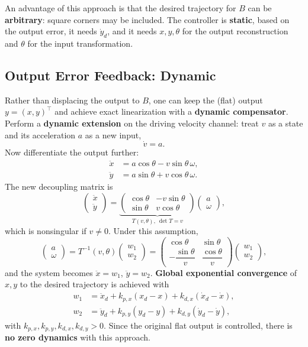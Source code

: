 An advantage of this approach is that the desired trajectory for
\( B \) can be \textbf{arbitrary}: square corners may be included. The
controller is \textbf{static}, based on the output error, it needs
\( \dot{y}_d \), and it needs \( x, y, \theta \) for the output
reconstruction and \( \theta \) for the input transformation.

\subsection{Output Error Feedback: Dynamic}
\label{subsec:output-error-dynamic}

Rather than displacing the output to \( B \), one can keep the (flat)
output \( y = (x, y)^\top \) and achieve exact linearization with a
\textbf{dynamic compensator}. Perform a \textbf{dynamic extension} on
the driving velocity channel: treat \( v \) as a state and its
acceleration \( a \) as a new input,
\[
\dot{v} = a.
\]
Now differentiate the output further:
\begin{align}
    \ddot{x} &= a \cos\theta - v \sin\theta\,\omega, \\
    \ddot{y} &= a \sin\theta + v \cos\theta\,\omega.
\end{align}
The new decoupling matrix is
\[
\begin{pmatrix} \ddot{x} \\ \ddot{y} \end{pmatrix}
=
\underbrace{
\begin{pmatrix}
    \cos\theta & -v \sin\theta \\
    \sin\theta & v \cos\theta
\end{pmatrix}}_{T(v, \theta),\ \det T = v}
\begin{pmatrix} a \\ \omega \end{pmatrix},
\]
which is nonsingular if \( v \neq 0 \). Under this assumption,
\[
\begin{pmatrix} a \\ \omega \end{pmatrix}
= T^{-1}(v, \theta)
  \begin{pmatrix} w_1 \\ w_2 \end{pmatrix}
=
\begin{pmatrix}
    \cos\theta & \sin\theta \\
    -\dfrac{\sin\theta}{v} & \dfrac{\cos\theta}{v}
\end{pmatrix}
\begin{pmatrix} w_1 \\ w_2 \end{pmatrix},
\]
and the system becomes \( \ddot{x} = w_1 \),
\( \ddot{y} = w_2 \). \textbf{Global exponential convergence} of
\( x, y \) to the desired trajectory is achieved with
\begin{align}
    w_1 &= \ddot{x}_d + k_{p,x} (x_d - x) + k_{d,x} (\dot{x}_d - \dot{x}), \\
    w_2 &= \ddot{y}_d + k_{p,y} (y_d - y) + k_{d,y} (\dot{y}_d - \dot{y}),
\end{align}
with \( k_{p,x}, k_{p,y}, k_{d,x}, k_{d,y} > 0 \). Since the original
flat output is controlled, there is \textbf{no zero dynamics} with
this approach.

